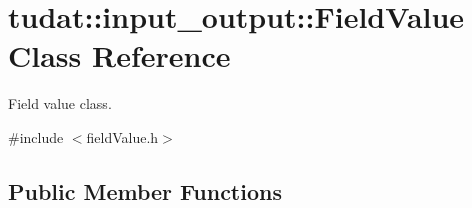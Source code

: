 \hypertarget{classtudat_1_1input__output_1_1FieldValue}{}\section{tudat\+:\+:input\+\_\+output\+:\+:Field\+Value Class Reference}
\label{classtudat_1_1input__output_1_1FieldValue}


Field value class.  




{\ttfamily \#include $<$field\+Value.\+h$>$}

\subsection*{Public Member Functions}
